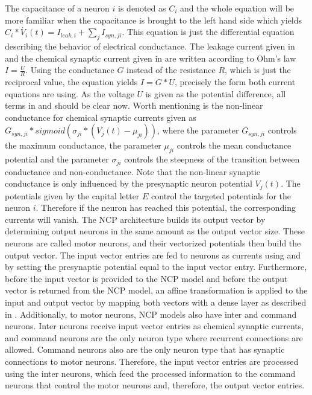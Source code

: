 \documentclass[draft,final]{vutinfth} %
\begin{document}
    The capacitance of a neuron $i$ is denoted as $C_i$ and the whole equation will be more familiar when the capacitance is brought to the left hand side which yields $C_i * \dot{V_i}(t) = I_{leak,i} + \sum_j{I_{syn,ji}}$.
    This equation is just the differential equation describing the behavior of electrical conductance.
    The leakage current given in  and the chemical synaptic current given in  are written according to Ohm's law $I = \frac{U}{R}$.
    Using the conductance $G$ instead of the resistance $R$, which is just the reciprocal value, the equation yields $I = G * U$, precisely the form both current equations are using.
    As the voltage $U$ is given as the potential difference, all terms in  and  should be clear now.
    Worth mentioning is the non-linear conductance for chemical synaptic currents given as $G_{syn,ji} * sigmoid(\sigma_{ji}*(V_j(t)-\mu_{ji}))$, where the parameter $G_{syn,ji}$ controls the maximum conductance, the parameter $\mu_{ji}$ controls the mean conductance potential and the parameter $\sigma_{ji}$ controls the steepness of the transition between conductance and non-conductance.
    Note that the non-linear synaptic conductance is only influenced by the presynaptic neuron potential $V_j(t)$.
    The potentials given by the capital letter $E$ control the targeted potentials for the neuron $i$. Therefore if the neuron has reached this potential, the corresponding currents will vanish.
    The NCP architecture builds its output vector by determining output neurons in the same amount as the output vector size.
    These neurons are called motor neurons, and their vectorized potentials then build the output vector.
    The input vector entries are fed to neurons as currents using  and by setting the presynaptic potential equal to the input vector entry.
    Furthermore, before the input vector is provided to the NCP model and before the output vector is returned from the NCP model, an affine transformation is applied to the input and output vector by mapping both vectors with a dense layer as described in .
    Additionally, to motor neurons, NCP models also have inter and command neurons.
    Inter neurons receive input vector entries as chemical synaptic currents, and command neurons are the only neuron type where recurrent connections are allowed.
    Command neurons also are the only neuron type that has synaptic connections to motor neurons.
    Therefore, the input vector entries are processed using the inter neurons, which feed the processed information to the command neurons that control the motor neurons and, therefore, the output vector entries.
\end{document}
